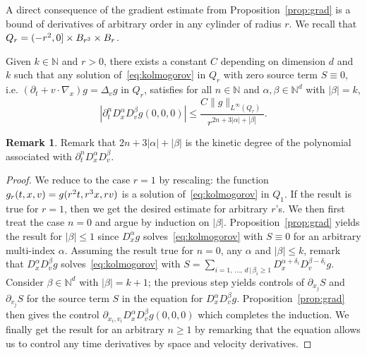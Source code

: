 \documentclass[10pt]{amsart}
\theoremstyle{definition}\newtheorem{defi}[theo]{Definition}\newtheorem{rema}[theo]{Remark}\newtheorem{exam}[theo]{Example}\newtheorem{exem}[theo]{Example}\newtheorem{nota}[theo]{Notation}
\newcommand{\N}{\mathbb{N}}
\begin{document}
A direct consequence of the gradient estimate from Proposition~\ref{prop:grad} is a bound of derivatives of arbitrary order in any cylinder of radius $r$. We recall that $Q_r\linebreak= (-r^2,0] \times B_{r^3} \times B_r$.

\begin{coro}\label{cor:deriv}
Given $k \in \N$ and $r>0$, there exists a constant $C$ depending on dimension $d$ and $k$ such that any solution of~\eqref{eq:kolmogorov} in $Q_r$ with zero source term $S \equiv 0$, i.e. $(\partial_t + v \cdot \nabla_x) g = \Delta_v g$ in $Q_r$, satisfies for all $n \in \N$ and $\alpha,\beta \in \N^d$ with $|\beta|=k$,
\[
\left|\partial_t^n D^\alpha_x D^\beta_v g(0,0,0)\right| \le \frac{C
\|g\|_{L^\infty(Q_r)}}{r^{2n +3|\alpha|+|\beta|}}.
\]
\end{coro}


\begin{rema}
Remark that $2n+3|\alpha|+|\beta|$ is the kinetic degree of the polynomial associated with $\partial_t^n D^\alpha_x D^\beta_v$.
\end{rema}


\begin{proof}
We reduce to the case $r=1$ by rescaling: the function $g_r (t,x,v) \linebreak= g(r^2 t, r^3 x, r v)$ is a solution of~\eqref{eq:kolmogorov} in $Q_1$. If the result is true for $r=1$, then we get the desired estimate for arbitrary $r$'s. We then first treat the case $n=0$ and argue by induction on $|\beta|$. Proposition~\ref{prop:grad} yields the result for $|\beta|\le 1$ since $D^\alpha_x g$ solves~\eqref{eq:kolmogorov} with $S \equiv 0$ for an arbitrary multi-index $\alpha$. Assuming the result true for $n=0$, any $\alpha$ and $|\beta| \le k$, remark that $D^\alpha_x D_v ^\beta g$ solves~\eqref{eq:kolmogorov} with $S =\sum_{i=1,\,\dots,\,d \, | \, \beta_i \ge 1} D^{\alpha+\delta_i} _x D^{\beta-\delta_i}_ v g$. Consider $\beta \in \N^d$ with $|\beta|=k+1$; the previous step yields controls of $\partial_{x_j} S$ and $\partial_{v_j} S$ for the source term $S$ in the equation for $D^\alpha_x D_v ^\beta g$. Proposition~\ref{prop:grad} then gives the control $\partial_{x_i,v_i} D^\alpha_x D_v ^\beta g(0,0,0)$ which completes the induction. We finally get the result for an arbitrary $n \ge 1$ by remarking that the equation allows us to control any time derivatives by space and velocity derivatives.
\end{proof}
\end{document}
